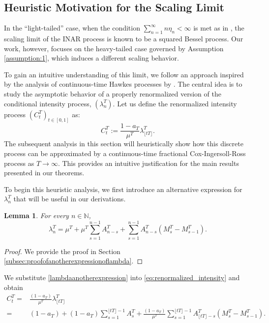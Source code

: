 \documentclass[letterpaper]{article}
\numberwithin{equation}{section}
\newtheorem{lemma}[theorem]{Lemma}
\theoremstyle{definition}
\theoremstyle{remark}
\begin{document}
\subsection{Heuristic Motivation for the Scaling Limit}
\label{subsec:Heuristic}

In the ``light-tailed'' case, when the condition $\sum_{n=1}^\infty n\eta_n < \infty$ is met as in \cite{barczy2011asymptotic}, the scaling limit of the INAR process is known to be a squared Bessel process. Our work, however, focuses on the heavy-tailed case governed by Assumption \ref{assumption:1}, which induces a different scaling behavior.

To gain an intuitive understanding of this limit, we follow an approach inspired by the analysis of continuous-time Hawkes processes by \cite{jaisson2016rough}. The central idea is to study the asymptotic behavior of a properly renormalized version of the conditional intensity process, $(\lambda_n^T)$. Let us define the renormalized intensity process $(C_t^T)_{t\in[0,1]}$ as:
\begin{equation}\label{eq:renormalized_intensity}
  C_t^T := \frac{1-a_T}{\mu^T} \lambda_{\lfloor tT \rfloor}^T.
\end{equation}
The subsequent analysis in this section will heuristically show how this discrete process can be approximated by a continuous-time fractional Cox-Ingersoll-Ross process as $T \to \infty$. This provides an intuitive justification for the main results presented in our theorems.

To begin this heuristic analysis, we first introduce an alternative expression for $\lambda_n^T$ that will be useful in our derivations.
\begin{lemma}\label{lemma:anotherexpressionoflambda}
  For every $n\in \mathbb N$, 
  \begin{equation}\label{lambdaanotherexpression}
    \lambda_n^T=\mu^T+\mu^T\sum_{s=1}^{n-1}A_{n-s}^T+\sum_{s=1}^{n-1}A_{n-s}^T\left( M_{s}^T-M_{s-1}^T \right).
  \end{equation}
\end{lemma}

\begin{proof}
  We provide the proof in Section \ref{subsec:proofofanotherexpressionoflambda}.
\end{proof}

We substitute \eqref{lambdaanotherexpression} into \eqref{eq:renormalized_intensity} and obtain
\begin{equation}\label{Cexpression}
  \begin{aligned}
  C_t^T
  =&\frac{(1-a_T)}{\mu^T}\lambda_{\lfloor tT \rfloor}^T\\
  =& (1-a_T)+(1-a_T)\sum_{s=1}^{\lfloor tT \rfloor-1}A_s^T+\frac{(1-a_T)}{\mu^T}\sum_{s=1}^{\lfloor tT \rfloor-1}A_{\lfloor tT \rfloor-s}^T(M_s^T-M_{s-1}^T).
  \end{aligned}
\end{equation}
\end{document}

